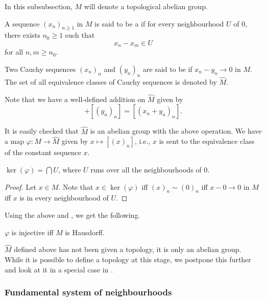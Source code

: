 In this subsubsection, $M$ will denote a topological abelian group. 

\begin{defn}
	A sequence $(x_{n})_{n \ge 1}$ in $M$ is said to be a  if for every neighbourhood $U$ of $0$, there exists $n_{0} \ge 1$ such that
	\begin{equation*} 
		x_{n} - x_{m} \in U
	\end{equation*} 
	for all $n, m \ge n_{0}$.

	Two Cauchy sequences $(x_{n})_{n}$ and $(y_{n})_{n}$ are said to be  if $x_{n} - y_{n} \to 0$ in $M$. The set of all equivalence classes of Cauchy sequences is denoted by $\widehat{M}$.
\end{defn}

Note that we have a well-defined addition on $\widehat{M}$ given by
\begin{equation*} 
	[(x_{n})_{n}] + [(y_{n})_{n}] = [(x_{n} + y_{n})_{n}].
\end{equation*}

It is easily checked that $\widehat{M}$ is an abelian group with the above operation. We have a map $\varphi : M \to \widehat{M}$ given by $x \mapsto [(x)_{n}]$, i.e., $x$ is sent to the equivalence class of the constant sequence $x$.

\begin{prop}
	$\ker(\varphi) = \bigcap U$, where $U$ runs over all the neighbourhoods of $0$.
\end{prop}
\begin{proof} 
	Let $x \in M$. Note that $x \in \ker(\varphi)$ iff $(x)_{n} \sim (0)_{n}$ iff $x - 0 \to 0$ in $M$ iff $x$ is in every neighbourhood of $U$.
\end{proof}

Using the above and , we get the following.
\begin{cor}
	$\varphi$ is injective iff $M$ is Hausdorff.
\end{cor}

\begin{rem}
	$\widehat{M}$ defined above has not been given a topology, it is only an abelian group. While it is possible to define a topology at this stage, we postpone this further and look at it in a special case in .
\end{rem}

\subsubsection{Fundamental system of neighbourhoods}

